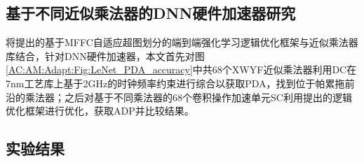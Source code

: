 \subsection{基于不同近似乘法器的DNN硬件加速器研究}

将提出的基于MFFC自适应超图划分的端到端强化学习逻辑优化框架与近似乘法器库结合，针对DNN硬件加速器，本文首先对图\ref{AC:AM:Adapt:Fig:LeNet_PDA_accuracy}中共68个XWYF近似乘法器利用DC在7nm工艺库\cite{ASAP7_github}上基于2GHz的时钟频率约束进行综合以获取PDA，找到位于帕累拖前沿的乘法器；之后对基于不同乘法器的68个卷积操作加速单元SC\cite{Accelerator:SC}利用提出的逻辑优化框架进行优化，获取ADP并比较结果。


\subsection{实验结果}

